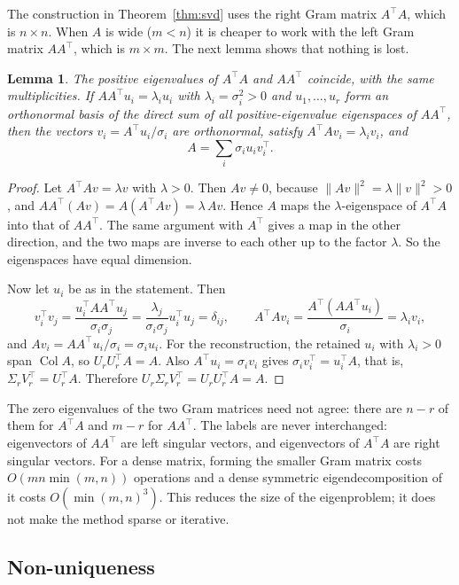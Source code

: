 \documentclass[12pt,a4paper]{report}
\newcommand{\norm}[1]{\lVert #1\rVert}
\newcommand{\T}{^{\top}}
\DeclareMathOperator{\Col}{Col}
\theoremstyle{plain}
\newtheorem{lemma}[theorem]{Lemma}
\theoremstyle{definition}
\theoremstyle{remark}
\theoremstyle{definition}
\begin{document}
The construction in Theorem~\ref{thm:svd} uses the right Gram matrix $A\T A$, which is $n\times n$. When $A$ is wide ($m<n$) it is cheaper to work with the left Gram matrix $AA\T$, which is $m\times m$. The next lemma shows that nothing is lost.

\begin{lemma}\label{lem:gram}
The positive eigenvalues of $A\T A$ and $AA\T$ coincide, with the same multiplicities. If $AA\T u_i=\lambda_iu_i$ with $\lambda_i=\sigma_i^2>0$ and $u_1,\ldots,u_r$ form an orthonormal basis of the direct sum of all positive-eigenvalue eigenspaces of $AA\T$, then the vectors $v_i=A\T u_i/\sigma_i$ are orthonormal, satisfy $A\T Av_i=\lambda_iv_i$, and
\[
A=\sum_{i}\sigma_i u_iv_i\T .
\]
\end{lemma}

\begin{proof}
Let $A\T Av=\lambda v$ with $\lambda>0$. Then $Av\ne0$, because $\norm{Av}^2=\lambda\norm{v}^2>0$, and $AA\T(Av)=A(A\T Av)=\lambda\,Av$. Hence $A$ maps the $\lambda$-eigenspace of $A\T A$ into that of $AA\T$. The same argument with $A\T$ gives a map in the other direction, and the two maps are inverse to each other up to the factor $\lambda$. So the eigenspaces have equal dimension.

Now let $u_i$ be as in the statement. Then
\[
v_i\T v_j=\frac{u_i\T AA\T u_j}{\sigma_i\sigma_j}=\frac{\lambda_j}{\sigma_i\sigma_j}u_i\T u_j=\delta_{ij},
\qquad
A\T Av_i=\frac{A\T(AA\T u_i)}{\sigma_i}=\lambda_i v_i,
\]
and $Av_i=AA\T u_i/\sigma_i=\sigma_iu_i$. For the reconstruction, the retained $u_i$ with $\lambda_i>0$ span $\Col A$, so $U_rU_r\T A=A$. Also $A\T u_i=\sigma_iv_i$ gives $\sigma_iv_i\T=u_i\T A$, that is, $\Sigma_rV_r\T=U_r\T A$. Therefore $U_r\Sigma_rV_r\T=U_rU_r\T A=A$.
\end{proof}

The zero eigenvalues of the two Gram matrices need not agree: there are $n-r$ of them for $A\T A$ and $m-r$ for $AA\T$. The labels are never interchanged: eigenvectors of $AA\T$ are left singular vectors, and eigenvectors of $A\T A$ are right singular vectors. For a dense matrix, forming the smaller Gram matrix costs $O(mn\min(m,n))$ operations and a dense symmetric eigendecomposition of it costs $O(\min(m,n)^3)$. This reduces the size of the eigenproblem; it does not make the method sparse or iterative.

\subsection{Non-uniqueness}\label{sec:nonunique}
\end{document}
